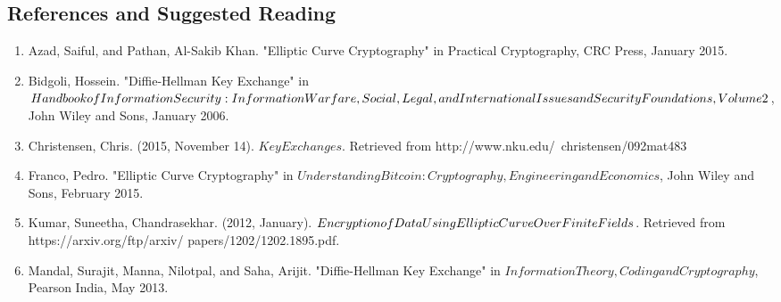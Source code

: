 \subsection{References and Suggested Reading} 
\begin{enumerate}[(1)]

\item
Azad, Saiful, and Pathan, Al-Sakib Khan. "Elliptic Curve Cryptography" in Practical Cryptography, CRC Press, January 2015.

\item 
Bidgoli, Hossein. "Diffie-Hellman Key Exchange" in $Handbook of Information \newline
Security: Information Warfare, Social, Legal, and International Issues and \newline
Security Foundations, Volume 2$, John Wiley and Sons, January 2006.

\item 
Christensen, Chris. (2015, November 14). $Key Exchanges$. Retrieved from http://www.nku.edu/~christensen/092mat483%

\item
Franco, Pedro. "Elliptic Curve Cryptography" in $Understanding Bitcoin: Cryptography, Engineering and Economics$, John Wiley and Sons, February 2015.

\item 
Kumar, Suneetha, Chandrasekhar. (2012, January). $Encryption of Data  Using \newline
Elliptic Curve Over Finite Fields$. Retrieved from https://arxiv.org/ftp/arxiv/ \newline
papers/1202/1202.1895.pdf.

\item 
Mandal, Surajit, Manna, Nilotpal, and Saha, Arijit. "Diffie-Hellman Key Exchange" in $Information Theory, Coding and Cryptography$, Pearson India, May 2013.





\end{enumerate}